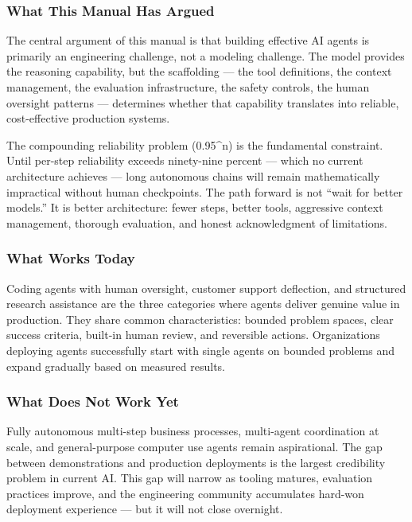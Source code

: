 \documentclass[11pt, a4paper]{article}
\begin{document}
\hypertarget{what-this-manual-has-argued}{%
\subsubsection{What This Manual Has
Argued}\label{what-this-manual-has-argued}}

The central argument of this manual is that building effective AI agents
is primarily an engineering challenge, not a modeling challenge. The
model provides the reasoning capability, but the scaffolding --- the
tool definitions, the context management, the evaluation infrastructure,
the safety controls, the human oversight patterns --- determines whether
that capability translates into reliable, cost-effective production
systems.

The compounding reliability problem (0.95\^{}n) is the fundamental
constraint. Until per-step reliability exceeds ninety-nine percent ---
which no current architecture achieves --- long autonomous chains will
remain mathematically impractical without human checkpoints. The path
forward is not ``wait for better models.'' It is better architecture:
fewer steps, better tools, aggressive context management, thorough
evaluation, and honest acknowledgment of limitations.

\hypertarget{what-works-today}{%
\subsubsection{What Works Today}\label{what-works-today}}

Coding agents with human oversight, customer support deflection, and
structured research assistance are the three categories where agents
deliver genuine value in production. They share common characteristics:
bounded problem spaces, clear success criteria, built-in human review,
and reversible actions. Organizations deploying agents successfully
start with single agents on bounded problems and expand gradually based
on measured results.

\hypertarget{what-does-not-work-yet}{%
\subsubsection{What Does Not Work Yet}\label{what-does-not-work-yet}}

Fully autonomous multi-step business processes, multi-agent coordination
at scale, and general-purpose computer use agents remain aspirational.
The gap between demonstrations and production deployments is the largest
credibility problem in current AI. This gap will narrow as tooling
matures, evaluation practices improve, and the engineering community
accumulates hard-won deployment experience --- but it will not close
overnight.
\end{document}
